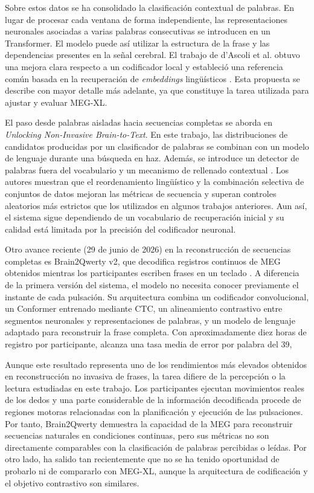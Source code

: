 Sobre estos datos se ha consolidado la clasificación contextual de palabras. En lugar de procesar cada ventana de forma independiente, las representaciones neuronales asociadas a varias palabras consecutivas se introducen en un Transformer. El modelo puede así utilizar la estructura de la frase y las dependencias presentes en la señal cerebral. El trabajo de d'Ascoli et al. obtuvo una mejora clara respecto a un codificador local y estableció una referencia común basada en la recuperación de \textit{embeddings} lingüísticos \cite{dascoli2024words}. Esta propuesta se describe con mayor detalle más adelante, ya que constituye la tarea utilizada para ajustar y evaluar MEG-XL.

El paso desde palabras aisladas hacia secuencias completas se aborda en \textit{Unlocking Non-Invasive Brain-to-Text}. En este trabajo, las distribuciones de candidatos producidas por un clasificador de palabras se combinan con un modelo de lenguaje durante una búsqueda en haz. Además, se introduce un detector de palabras fuera del vocabulario y un mecanismo de rellenado contextual \cite{jayalath2025unlocking}. Los autores muestran que el reordenamiento lingüístico y la combinación selectiva de conjuntos de datos mejoran las métricas de secuencia y superan controles aleatorios más estrictos que los utilizados en algunos trabajos anteriores. Aun así, el sistema sigue dependiendo de un vocabulario de recuperación inicial y su calidad está limitada por la precisión del codificador neuronal.

Otro avance reciente (29 de junio de 2026) en la reconstrucción de secuencias completas es Brain2Qwerty v2, que decodifica registros continuos de MEG obtenidos mientras los participantes escriben frases en un teclado \cite{zhang2026brain2qwertyv2}. A diferencia de la primera versión del sistema, el modelo no necesita conocer previamente el instante de cada pulsación. Su arquitectura combina un codificador convolucional, un Conformer entrenado mediante CTC, un alineamiento contrastivo entre segmentos neuronales y representaciones de palabras, y un modelo de lenguaje adaptado para reconstruir la frase completa. Con aproximadamente diez horas de registro por participante, alcanza una tasa media de error por palabra del 39,%

Aunque este resultado representa uno de los rendimientos más elevados obtenidos en reconstrucción no invasiva de frases, la tarea difiere de la percepción o la lectura estudiadas en este trabajo. Los participantes ejecutan movimientos reales de los dedos y una parte considerable de la información decodificada procede de regiones motoras relacionadas con la planificación y ejecución de las pulsaciones. Por tanto, Brain2Qwerty demuestra la capacidad de la MEG para reconstruir secuencias naturales en condiciones continuas, pero sus métricas no son directamente comparables con la clasificación de palabras percibidas o leídas. Por otro lado, ha salido tan recientemente que no se ha tenido oportunidad de probarlo ni de compararlo con MEG-XL, aunque la arquitectura de codificación y el objetivo contrastivo son similares.

